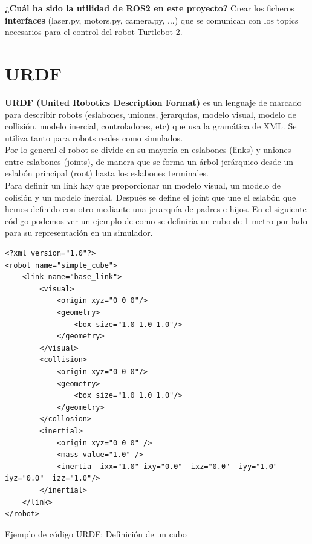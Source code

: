 \textbf{¿Cuál ha sido la utilidad de ROS2 en este proyecto?} Crear los ficheros \textbf{interfaces} (laser.py, motors.py, camera.py, ...) que se comunican con los topics necesarios para el control del robot Turtlebot 2.\\




\section{URDF}
\label{sec:urdf}

\textbf{URDF (United Robotics Description Format)} es un lenguaje de marcado para describir robots (eslabones, uniones, jerarquías, modelo visual, modelo de collisión, modelo inercial, controladores, etc) que usa la gramática de XML. Se utiliza tanto para robots reales como simulados.\\

Por lo general el robot se divide en su mayoría en eslabones (links) y uniones entre eslabones (joints), de manera que se forma un árbol jerárquico desde un eslabón principal (root) hasta los eslabones terminales.\\

Para definir un link hay que proporcionar un modelo visual, un modelo de colisión y un modelo inercial. Después se define el joint que une el eslabón que hemos definido con otro mediante una jerarquía de padres e hijos. En el siguiente código podemos ver un ejemplo de como se definiría un cubo de 1 metro por lado para su representación en un simulador.\\

\begin{code}[H]
\begin{lstlisting}
<?xml version="1.0"?>
<robot name="simple_cube">
	<link name="base_link">
		<visual>
			<origin xyz="0 0 0"/>
			<geometry>
				<box size="1.0 1.0 1.0"/>
			</geometry>
		</visual>
		<collision>
			<origin xyz="0 0 0"/>
			<geometry>
				<box size="1.0 1.0 1.0"/>
			</geometry>
		</collosion>
		<inertial>
			<origin xyz="0 0 0" /> 
			<mass value="1.0" />
			<inertia  ixx="1.0" ixy="0.0"  ixz="0.0"  iyy="1.0"  iyz="0.0"  izz="1.0"/>
		</inertial>
	</link>
</robot>
\end{lstlisting}
\caption[Ejemplo de código URDF: Definición de un cubo]{Ejemplo de código URDF: Definición de un cubo}
\label{cod:codigo_urdf}
\end{code}

